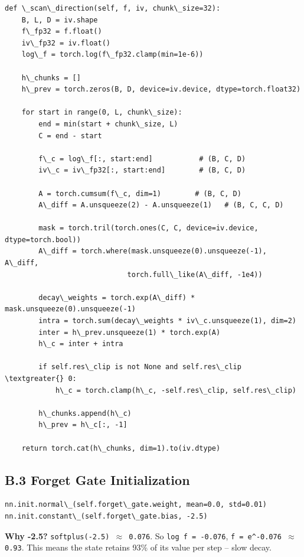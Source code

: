 \begin{lstlisting}
def \_scan\_direction(self, f, iv, chunk\_size=32):
    B, L, D = iv.shape
    f\_fp32 = f.float()
    iv\_fp32 = iv.float()
    log\_f = torch.log(f\_fp32.clamp(min=1e-6))
    
    h\_chunks = []
    h\_prev = torch.zeros(B, D, device=iv.device, dtype=torch.float32)
    
    for start in range(0, L, chunk\_size):
        end = min(start + chunk\_size, L)
        C = end - start
        
        f\_c = log\_f[:, start:end]           # (B, C, D)
        iv\_c = iv\_fp32[:, start:end]        # (B, C, D)
        
        A = torch.cumsum(f\_c, dim=1)        # (B, C, D)
        A\_diff = A.unsqueeze(2) - A.unsqueeze(1)   # (B, C, C, D)
        
        mask = torch.tril(torch.ones(C, C, device=iv.device, dtype=torch.bool))
        A\_diff = torch.where(mask.unsqueeze(0).unsqueeze(-1), A\_diff, 
                             torch.full\_like(A\_diff, -1e4))
        
        decay\_weights = torch.exp(A\_diff) * mask.unsqueeze(0).unsqueeze(-1)
        intra = torch.sum(decay\_weights * iv\_c.unsqueeze(1), dim=2)
        inter = h\_prev.unsqueeze(1) * torch.exp(A)
        h\_c = inter + intra
        
        if self.res\_clip is not None and self.res\_clip \textgreater{} 0:
            h\_c = torch.clamp(h\_c, -self.res\_clip, self.res\_clip)
        
        h\_chunks.append(h\_c)
        h\_prev = h\_c[:, -1]
    
    return torch.cat(h\_chunks, dim=1).to(iv.dtype)
\end{lstlisting}

\subsection{B.3 Forget Gate Initialization}

\begin{lstlisting}
nn.init.normal\_(self.forget\_gate.weight, mean=0.0, std=0.01)
nn.init.constant\_(self.forget\_gate.bias, -2.5)
\end{lstlisting}

\textbf{Why -2.5?} \texttt{softplus(-2.5) $\approx$ 0.076}. So \texttt{log f = -0.076}, 
\texttt{f = e^{-0.076} $\approx$ 0.93}. This means the state retains 93\% of its value 
per step -- slow decay.

